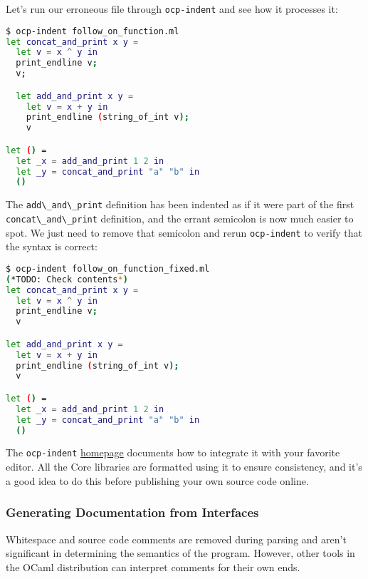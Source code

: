 Let's run our erroneous file through
\passthrough{\lstinline!ocp-indent!} and see how it processes it:

\begin{lstlisting}[language=bash]
$ ocp-indent follow_on_function.ml
let concat_and_print x y =
  let v = x ^ y in
  print_endline v;
  v;

  let add_and_print x y =
    let v = x + y in
    print_endline (string_of_int v);
    v

let () =
  let _x = add_and_print 1 2 in
  let _y = concat_and_print "a" "b" in
  ()
\end{lstlisting}

The \passthrough{\lstinline!add\_and\_print!} definition has been
indented as if it were part of the first
\passthrough{\lstinline!concat\_and\_print!} definition, and the errant
semicolon is now much easier to spot. We just need to remove that
semicolon and rerun \passthrough{\lstinline!ocp-indent!} to verify that
the syntax is correct:

\begin{lstlisting}[language=bash]
$ ocp-indent follow_on_function_fixed.ml
(*TODO: Check contents*)
let concat_and_print x y =
  let v = x ^ y in
  print_endline v;
  v

let add_and_print x y =
  let v = x + y in
  print_endline (string_of_int v);
  v

let () =
  let _x = add_and_print 1 2 in
  let _y = concat_and_print "a" "b" in
  ()
\end{lstlisting}

The \passthrough{\lstinline!ocp-indent!}
\href{https://github.com/OCamlPro/ocp-indent}{homepage} documents how to
integrate it with your favorite editor. All the Core libraries are
formatted using it to ensure consistency, and it's a good idea to do
this before publishing your own source code online.

\hypertarget{generating-documentation-from-interfaces}{%
\subsubsection{Generating Documentation from
Interfaces}\label{generating-documentation-from-interfaces}}

Whitespace and source code comments are removed during parsing and
aren't significant in determining the semantics of the program. However,
other tools in the OCaml distribution can interpret comments for their
own ends. 

